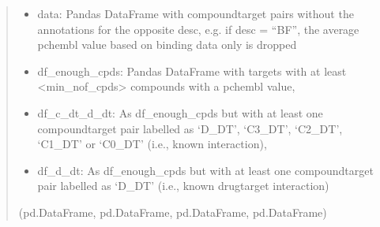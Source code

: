 \documentclass[letterpaper,10pt,english]{sphinxmanual}
\begin{document}
\begin{fulllineitems}
\begin{quote}
\begin{description}
\begin{itemize}
\end{itemize}

\sphinxAtStartPar
\begin{itemize}
\item {} 
\sphinxAtStartPar
data: Pandas DataFrame with compound\sphinxhyphen{}target pairs without the annotations for the opposite desc,             e.g. if desc = “BF”, the average pchembl value based on binding data only is dropped

\item {} 
\sphinxAtStartPar
df\_enough\_cpds: Pandas DataFrame with targets with at least \textless{}min\_nof\_cpds\textgreater{} compounds with a pchembl value,

\item {} 
\sphinxAtStartPar
df\_c\_dt\_d\_dt: As df\_enough\_cpds but with             at least one compound\sphinxhyphen{}target pair labelled as ‘D\_DT’, ‘C3\_DT’, ‘C2\_DT’, ‘C1\_DT’ or ‘C0\_DT’ (i.e., known interaction),

\item {} 
\sphinxAtStartPar
df\_d\_dt: As df\_enough\_cpds but with             at least one compound\sphinxhyphen{}target pair labelled as ‘D\_DT’ (i.e., known drug\sphinxhyphen{}target interaction)

\end{itemize}


\sphinxAtStartPar
(pd.DataFrame, pd.DataFrame, pd.DataFrame, pd.DataFrame)

\end{description}\end{quote}

\end{fulllineitems}

\end{document}
